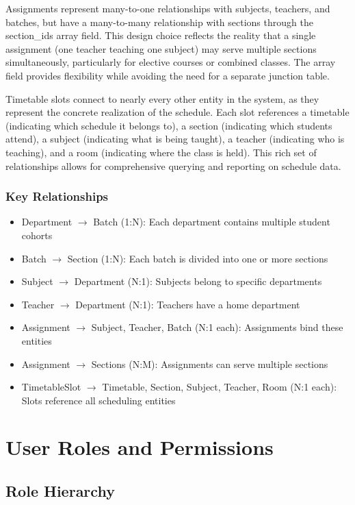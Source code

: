 \documentclass[12pt,a4paper]{article}
\begin{document}
Assignments represent many-to-one relationships with subjects, teachers, and batches, but have a many-to-many relationship with sections through the section\_ids array field. This design choice reflects the reality that a single assignment (one teacher teaching one subject) may serve multiple sections simultaneously, particularly for elective courses or combined classes. The array field provides flexibility while avoiding the need for a separate junction table.

Timetable slots connect to nearly every other entity in the system, as they represent the concrete realization of the schedule. Each slot references a timetable (indicating which schedule it belongs to), a section (indicating which students attend), a subject (indicating what is being taught), a teacher (indicating who is teaching), and a room (indicating where the class is held). This rich set of relationships allows for comprehensive querying and reporting on schedule data.

\subsubsection{Key Relationships}
\begin{itemize}
    \item Department $\rightarrow$ Batch (1:N): Each department contains multiple student cohorts
    \item Batch $\rightarrow$ Section (1:N): Each batch is divided into one or more sections
    \item Subject $\rightarrow$ Department (N:1): Subjects belong to specific departments
    \item Teacher $\rightarrow$ Department (N:1): Teachers have a home department
    \item Assignment $\rightarrow$ Subject, Teacher, Batch (N:1 each): Assignments bind these entities
    \item Assignment $\rightarrow$ Sections (N:M): Assignments can serve multiple sections
    \item TimetableSlot $\rightarrow$ Timetable, Section, Subject, Teacher, Room (N:1 each): Slots reference all scheduling entities
\end{itemize}

\section{User Roles and Permissions}

\subsection{Role Hierarchy}
\end{document}
